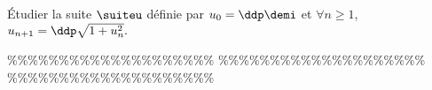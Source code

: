 



\begin{exercice} \;
\'Etudier la suite $\suiteu$ d\'efinie par $u_0=\ddp\demi$ et $\forall n \geq 1$, $u_{n+1}=\ddp\sqrt{1+u_n^2}.$
\end{exercice}


\%\%\%\%\%\%\%\%\%\%\%\%\%\%\%\%\%\%\%\%
\%\%\%\%\%\%\%\%\%\%\%\%\%\%\%\%\%\%\%\%
\%\%\%\%\%\%\%\%\%\%\%\%\%\%\%\%\%\%\%\%





